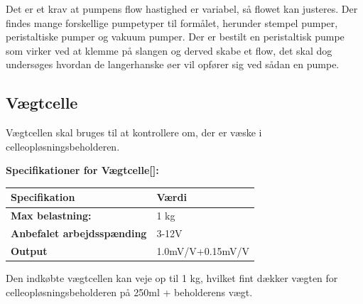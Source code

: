 Det er et krav at pumpens flow hastighed er variabel, så flowet kan justeres. Der findes mange forskellige pumpetyper til formålet, herunder stempel pumper, peristaltiske pumper og vakuum pumper. Der er bestilt en peristaltisk pumpe som virker ved at klemme på slangen og derved skabe et flow, det skal dog undersøges hvordan de langerhanske øer vil opfører sig ved sådan en pumpe.

\subsection{Vægtcelle}
\label{subsec:loadcell}
Vægtcellen skal bruges til at kontrollere om, der er væske i celleopløsningsbeholderen.

\textbf{Specifikationer for Vægtcelle[\citet{DH7}]:} 
\begin{center}
		\begin{longtable}{ | m{6.5cm} | m{6.5cm}| } 
			\hline
			\textbf{Specifikation} &\textbf{Værdi} \\ 
			\hline
			\textbf{Max belastning:} & 1 kg \\ 
			\hline
			\textbf{Anbefalet arbejdsspænding} & 3-12V \\ 
			\hline
			\textbf{Output} & 1.0mV/V+0.15mV/V \\ 
			\hline
		\end{longtable}
\end{center}

Den indkøbte vægtcellen kan veje op til 1 kg, hvilket fint dækker vægten for celleopløsningsbeholderen på 250ml + beholderens vægt.



\newpage
